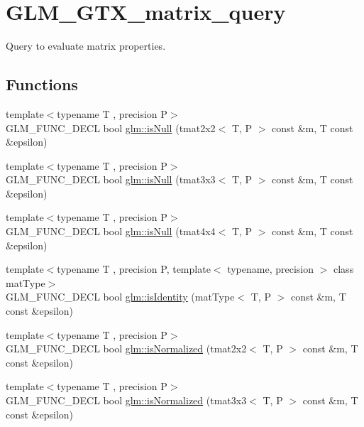 \hypertarget{group__gtx__matrix__query}{}\section{G\+L\+M\+\_\+\+G\+T\+X\+\_\+matrix\+\_\+query}
\label{group__gtx__matrix__query}


Query to evaluate matrix properties.  


\subsection*{Functions}
\begin{DoxyCompactItemize}
\item 
{\footnotesize template$<$typename T , precision P$>$ }\\G\+L\+M\+\_\+\+F\+U\+N\+C\+\_\+\+D\+E\+C\+L bool \hyperlink{group__gtx__matrix__query_ga37e535cbeaea383b8c1247b98875cd4b}{glm\+::is\+Null} (tmat2x2$<$ T, P $>$ const \&m, T const \&epsilon)
\item 
{\footnotesize template$<$typename T , precision P$>$ }\\G\+L\+M\+\_\+\+F\+U\+N\+C\+\_\+\+D\+E\+C\+L bool \hyperlink{group__gtx__matrix__query_gac67a5c7e029a84b74b02ac9599b8972d}{glm\+::is\+Null} (tmat3x3$<$ T, P $>$ const \&m, T const \&epsilon)
\item 
{\footnotesize template$<$typename T , precision P$>$ }\\G\+L\+M\+\_\+\+F\+U\+N\+C\+\_\+\+D\+E\+C\+L bool \hyperlink{group__gtx__matrix__query_ga326de496972051413c7b44b85fc9cb6e}{glm\+::is\+Null} (tmat4x4$<$ T, P $>$ const \&m, T const \&epsilon)
\item 
{\footnotesize template$<$typename T , precision P, template$<$ typename, precision $>$ class mat\+Type$>$ }\\G\+L\+M\+\_\+\+F\+U\+N\+C\+\_\+\+D\+E\+C\+L bool \hyperlink{group__gtx__matrix__query_gafc1ce12c738b8c5d007179e615609330}{glm\+::is\+Identity} (mat\+Type$<$ T, P $>$ const \&m, T const \&epsilon)
\item 
{\footnotesize template$<$typename T , precision P$>$ }\\G\+L\+M\+\_\+\+F\+U\+N\+C\+\_\+\+D\+E\+C\+L bool \hyperlink{group__gtx__matrix__query_ga11a8d5cdb36496b85f61e4f5f7f2602c}{glm\+::is\+Normalized} (tmat2x2$<$ T, P $>$ const \&m, T const \&epsilon)
\item 
{\footnotesize template$<$typename T , precision P$>$ }\\G\+L\+M\+\_\+\+F\+U\+N\+C\+\_\+\+D\+E\+C\+L bool \hyperlink{group__gtx__matrix__query_ga351bcc8d485d329b78cfa875e084964d}{glm\+::is\+Normalized} (tmat3x3$<$ T, P $>$ const \&m, T const \&epsilon)

\end{DoxyCompactItemize}
